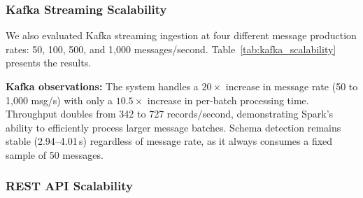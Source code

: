 \subsubsection{Kafka Streaming Scalability}

We also evaluated Kafka streaming ingestion at four different message production rates: 50, 100, 500, and 1,000 messages/second. Table~\ref{tab:kafka_scalability} presents the results.

\begin{table}[ht]
\centering
\caption{Kafka streaming scalability at different message rates (mean $\pm$ std, N=10)}
\label{tab:kafka_scalability}
\end{table}

\textbf{Kafka observations:} The system handles a $20\times$ increase in message rate (50 to 1,000 msg/s) with only a $10.5\times$ increase in per-batch processing time. Throughput doubles from 342 to 727 records/second, demonstrating Spark's ability to efficiently process larger message batches. Schema detection remains stable (2.94--4.01\,s) regardless of message rate, as it always consumes a fixed sample of 50 messages.



\subsubsection{REST API Scalability}

